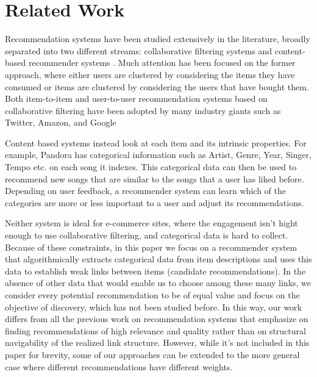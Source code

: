 \section{Related Work}

Recommendation systems have been studied extensively in the literature, %
broadly separated into two different streams: collaborative filtering systems and content-based recommender systems \cite{almazro2010survey}. Much attention has been focused on the former approach, where either users are clustered by considering the items they have consumed or items are clustered by considering the users that have bought them. Both item-to-item and user-to-user recommendation systems based on collaborative filtering have been adopted by many industry giants such as Twitter, %
Amazon, %
and Google %
 

Content based systems instead look at each item and its intrinsic properties. For example, Pandora has categorical information such as Artist, Genre, Year, Singer, Tempo etc. on each song it indexes. This categorical data can then be used to recommend new songs that are similar to the songs that a user has liked before. Depending on user feedback, a recommender system can learn which of the categories are more or less important to a user and adjust its recommendations.  

Neither system is ideal for e-commerce sites, where the engagement isn't hight enough to use collaborative filtering, and categorical data is hard to collect. Because of these constraints, in this paper we focus on a recommender system that algorithmically extracts categorical data from item descriptions and uses this data to establish weak links between items (candidate recommendations). In the absence of other data that would enable us to choose among these many links, we consider every potential recommendation to be of equal value and focus on the objective of discovery, which has not been studied before. In this way, our work differs from all the previous work on recommendation systems that emphasize on finding recommendations of high relevance and quality rather than on structural navigability of the realized link structure. However, while it's not included in this paper for brevity, some of our approaches can be extended to the more general case where different recommendations have different weights.  

